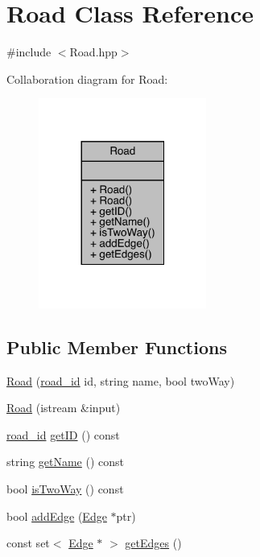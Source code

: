 \hypertarget{class_road}{}\section{Road Class Reference}
\label{class_road}


{\ttfamily \#include $<$Road.\+hpp$>$}



Collaboration diagram for Road\+:
\nopagebreak
\begin{figure}[H]
\begin{center}
\leavevmode
\includegraphics[width=156pt]{class_road__coll__graph}
\end{center}
\end{figure}
\subsection*{Public Member Functions}
\begin{DoxyCompactItemize}
\item 
\hyperlink{class_road_a4bd6abfd59885bb839dff8642b32db92}{Road} (\hyperlink{_road_8hpp_a8e0db0d135782948da5d293720dbfb46}{road\+\_\+id} id, string name, bool two\+Way)
\item 
\hyperlink{class_road_a96d7a3bee9ce4ea3ed6ed8eb24298085}{Road} (istream \&input)
\item 
\hyperlink{_road_8hpp_a8e0db0d135782948da5d293720dbfb46}{road\+\_\+id} \hyperlink{class_road_a4e0440c1d5bf11800f0df3c50dcb4b92}{get\+ID} () const
\item 
string \hyperlink{class_road_ae7c959eda8a11bc859ab5de5e278b735}{get\+Name} () const
\item 
bool \hyperlink{class_road_a9c412810b3a630a759f199c60f7f1cc6}{is\+Two\+Way} () const
\item 
bool \hyperlink{class_road_a7a691f98e8bd53299ed2539de1e4d13c}{add\+Edge} (\hyperlink{class_edge}{Edge} $\ast$ptr)
\item 
const set$<$ \hyperlink{class_edge}{Edge} $\ast$ $>$ \hyperlink{class_road_a03fb1c0a74b860e4be6c951154add098}{get\+Edges} ()
\end{DoxyCompactItemize}



